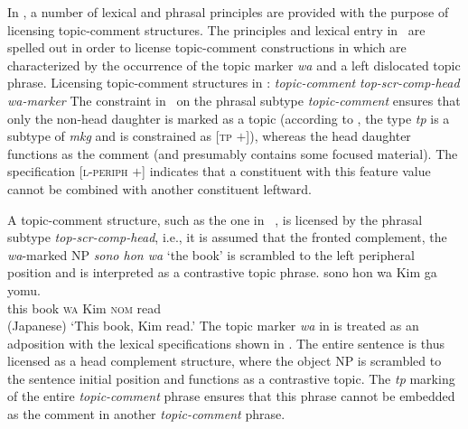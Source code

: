 \documentclass[output=paper,biblatex,babelshorthands,newtxmath,draftmode,colorlinks,citecolor=brown]{langscibook}
\begin{document}
In , a number of lexical and phrasal principles are
provided with the purpose of licensing topic-comment structures. The
principles and lexical entry in~ are spelled out
in order to license topic-comment constructions in  which are
characterized by the occurrence of the topic marker \emph{wa} and a
left dislocated topic phrase.
\ea
\label{ex:song-topic}
Licensing topic-comment structures in :
\ea
\label{ex:song-topic-a}
\textit{topic-comment}
\impl
{}
  \ex
  \label{ex:song-topic-b}
  \textit{top-scr-comp-head}
\impl
  \ex
  \label{ex:song-topic-c}
  \textit{wa-marker}
\impl
\z
\z
The constraint in~ on the phrasal subtype
\textit{topic-comment} ensures that only the non-head daughter is
marked as a topic (according to \citet[122]{song2018}, the type
\textit{tp} is a subtype of \textit{mkg} and is constrained as
[\textsc{tp} $+$]), whereas the head daughter functions as the comment
(and presumably contains some focused material). The specification
[\textsc{l-periph} $+$] indicates that a constituent with this feature
value cannot be combined with another constituent leftward.

A  topic-comment structure, such as the one
in~ \citep[198]{song2018}, is licensed by the phrasal
subtype \textit{top-scr-comp-head}, i.e., it is assumed that the
fronted complement, the \emph{wa}-marked NP \textit{sono hon wa} `the book'
is scrambled to the left peripheral position and is interpreted as a
contrastive topic phrase.
\ea
\label{ex:song-wa}
\gll sono hon wa Kim ga yomu.\\
this book \textsc{wa} Kim \textsc{nom} read \\\hfill(Japanese)
\trans `This book, Kim read.'
\z
The topic marker \emph{wa} in  is treated as an adposition with the
lexical specifications shown in . The entire
sentence is thus licensed as a head complement structure, where the
object NP is scrambled to the sentence initial position and functions
as a contrastive topic. The \textit{tp} marking of the entire
\textit{topic-comment} phrase ensures that this phrase cannot be
embedded as the comment in another \textit{topic-comment} phrase.
\end{document}
